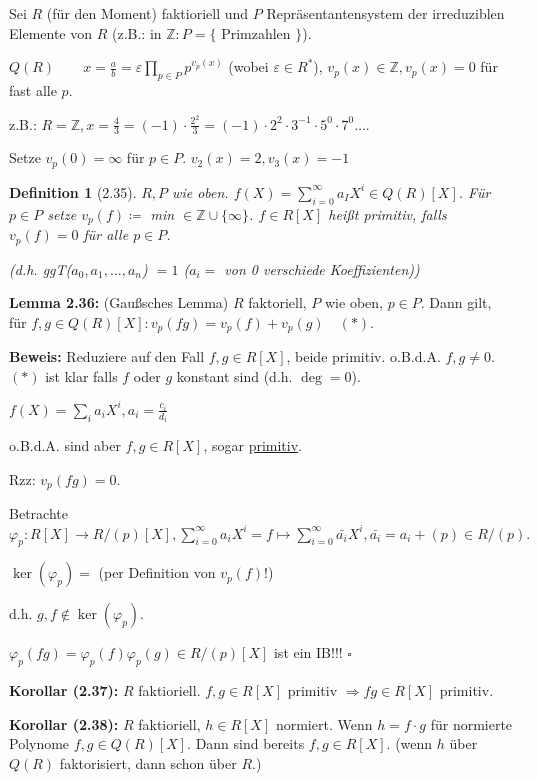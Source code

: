\documentclass[10pt,a4paper]{article}
\newtheorem{defi}{Definition}
\begin{document}
Sei $R$ (für den Moment) faktioriell und $P$ Repräsentantensystem der irreduziblen Elemente von $R$ (z.B.: in $\mathbb{Z}: P = \{$ Primzahlen $\}$).

$Q(R)\qquad x = \frac{a}{b} = \varepsilon \prod_{p \in P} p^{v_p(x)}$ (wobei $\varepsilon \in R^*$), $v_p(x) \in \mathbb{Z}, v_p(x) = 0$ für fast alle $p$.

z.B.: $R = \mathbb{Z}, x = \frac{4}{3} = (-1) \cdot \frac{2^2}{3} = (-1) \cdot 2^2 \cdot 3^{-1} \cdot 5^0 \cdot 7^0 \dots$.

Setze $v_p(0) = \infty$ für $p \in P$. $v_2(x) = 2, v_3(x) = -1$\bigskip

\begin{defi}[2.35]
$R,P$ wie oben. $f(X) = \sum_{i=0}^{\infty} a_I X^i \in Q(R)[X]$. Für $p \in P$ setze $v_p(f) \coloneqq$ min  $\in \mathbb{Z} \cup \{\infty\}$. $f \in R[X]$ heißt \emph{primitiv}, falls $v_p(f) = 0$ für alle $p \in P$. 

(d.h. ggT($a_0, a_1, \dots, a_n$) $=1$ ($a_i = $ von 0 verschiede Koeffizienten))
\end{defi}

\textbf{Lemma 2.36:} (Gaußsches Lemma)
$R$ faktoriell, $P$ wie oben, $p \in P$. Dann gilt, für $f,g \in Q(R)[X]: v_p(fg) = v_p(f) + v_p(g) \quad (*)$.

\textbf{Beweis:} Reduziere auf den Fall $f, g \in R[X]$, beide primitiv.
o.B.d.A. $f,g \neq 0$. $(*)$ ist klar falls $f$ oder $g$ konstant sind (d.h. $\deg = 0$).

$f(X) = \sum_i a_i X^i, a_i = \frac{c_i}{d_i}$

o.B.d.A. sind aber $f,g \in R[X]$, sogar \underline{primitiv}.

Rzz: $v_p(fg) = 0$.

Betrachte $\varphi_p : R[X] \to R / (p) [X], \sum_{i=0}^{\infty} a_i X^i = f \mapsto \sum_{i=0}^{\infty} \bar{a_i} X^i, \bar{a_i} = a_i + (p) \in R / (p).$

$\ker (\varphi_p) = $ (per Definition von $v_p(f)$!)

d.h. $g,f \notin \ker(\varphi_p).$

$\varphi_p(fg) = \varphi_p(f) \varphi_p(g) \in R/(p) [X]$ ist ein IB!!! $\square$\bigskip

\textbf{Korollar (2.37):} $R$ faktioriell. $f,g \in R[X]$ primitiv $\Rightarrow fg \in R[X]$ primitiv.

\textbf{Korollar (2.38):} $R$ faktioriell, $h \in R[X]$ normiert. Wenn $h = f \cdot g$ für normierte Polynome $f,g \in Q(R)[X]$. Dann sind bereits $f,g \in R[X]$. (\glqq wenn $h$ über $Q(R)$ faktorisiert, dann schon über $R$.\grqq)
\end{document}
